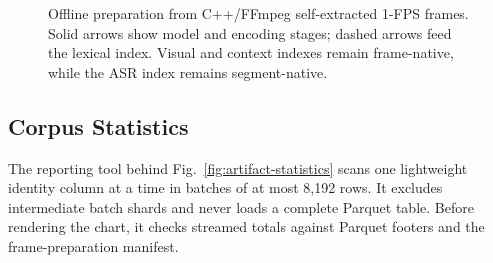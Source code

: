 \begin{figure}[htbp]
{%
}
\caption{Offline preparation from C++/FFmpeg self-extracted 1-FPS frames. Solid
arrows show model and encoding stages; dashed arrows feed the lexical index.
Visual and context indexes remain frame-native, while the ASR index remains
segment-native.}
\label{fig:preparation}
\end{figure}

\subsection{Corpus Statistics}

The reporting tool behind Fig.~\ref{fig:artifact-statistics} scans one lightweight
identity column at a time in batches of at most 8{,}192 rows. It excludes
intermediate batch shards and never loads a complete Parquet table. Before
rendering the chart, it checks streamed totals against Parquet footers and the
frame-preparation manifest.

